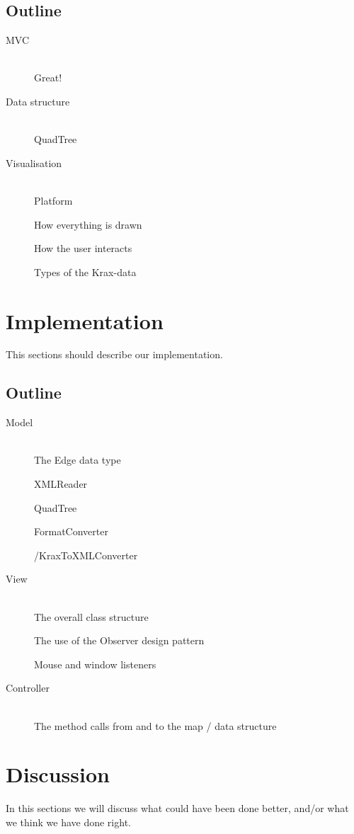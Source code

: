 \documentclass[a4paper,11pt]{article}
\begin{document}
\subsection{Outline}
\begin{description}
	\item[MVC] \hfill \\
	Great!
	\item[Data structure] \hfill \\
	QuadTree
	\item[Visualisation] \hfill \\
	Platform
	
	How everything is drawn
	
	How the user interacts
	
	Types of the Krax-data
\end{description}

\pagebreak
\section{Implementation} %
\label{sec:Implementation}
This sections should describe our implementation.

\subsection{Outline}
\begin{description}
	\item[Model] \hfill \\
	The Edge data type
	
	XMLReader
	
	QuadTree
	
	FormatConverter
	
	/KraxToXMLConverter
	\item[View] \hfill \\
	The overall class structure
	
	The use of the Observer design pattern
	
	Mouse and window listeners
	\item[Controller] \hfill \\
	The method calls from and to the map / data structure
\end{description}

\pagebreak
\section{Discussion} %
\label{sec:Discussion}
In this sections we will discuss what could have been done better, and/or what we think we have done right.
\end{document}

